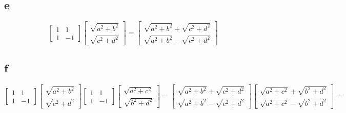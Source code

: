 \documentclass[letterpaper,notitlepage,twoside]{article}
\begin{document}
\subsection*{e}
\[
\begin{bmatrix}
1 &  1 \\
1 & -1
\end{bmatrix}
\begin{bmatrix}
\sqrt{a^2 + b^2} \\
\sqrt{c^2 + d^2}
\end{bmatrix}
=
\begin{bmatrix}
\sqrt{a^2 + b^2} + \sqrt{c^2 + d^2}\\
\sqrt{a^2 + b^2} - \sqrt{c^2 + d^2}
\end{bmatrix}
\]
\subsection*{f}
$\begin{bmatrix}
1 &  1 \\
1 & -1
\end{bmatrix}
\begin{bmatrix}
\sqrt{a^2 + b^2} \\
\sqrt{c^2 + d^2}
\end{bmatrix}
\begin{bmatrix}
1 &  1 \\
1 & -1
\end{bmatrix}
\begin{bmatrix}
\sqrt{a^2 + c^2} \\
\sqrt{b^2 + d^2}
\end{bmatrix}
=
\begin{bmatrix}
\sqrt{a^2 + b^2} + \sqrt{c^2 + d^2}\\
\sqrt{a^2 + b^2} - \sqrt{c^2 + d^2}
\end{bmatrix}
\begin{bmatrix}
\sqrt{a^2 + c^2} + \sqrt{b^2 + d^2} \\
\sqrt{a^2 + c^2} - \sqrt{b^2 + d^2}
\end{bmatrix}
=
$
\end{document}
